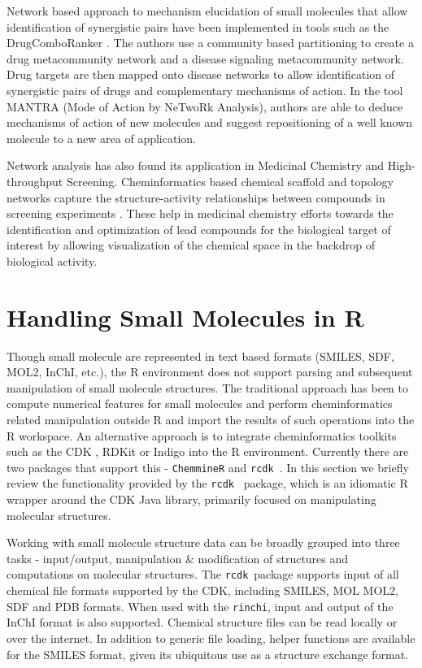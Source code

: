 \documentclass[12pt,letterpaper]{article}
\newcommand{\rcdk}{\texttt{rcdk}\ }
\begin{document}
Network based approach to mechanism elucidation of small molecules that allow identification of synergistic pairs have been implemented in tools such as the DrugComboRanker \cite{huang2014drugcomboranker}. The authors use a community based partitioning to create a drug metacommunity network and a disease signaling metacommunity network. Drug targets are then mapped onto disease networks to allow identification of synergistic pairs of drugs and complementary mechanisms of action.
In the tool MANTRA (Mode of Action by NeTwoRk Analysis)\cite{iorio2010discovery}, authors are able to deduce mechanisms of action of new molecules and suggest repositioning of a well known molecule to a new area of application.

Network analysis has also found its application in Medicinal Chemistry and High-throughput Screening. Cheminformatics based chemical scaffold and topology networks capture the structure-activity relationships between compounds in screening experiments \cite{varin2011mining}. These help in medicinal chemistry efforts towards the identification and optimization of lead compounds for the  biological target of interest by allowing visualization of the chemical space in the backdrop of biological activity. 
  

\section{Handling Small Molecules in R}
\label{sec:handl-small-molec}

Though small molecule are represented in text based formats (SMILES,
SDF, MOL2, InChI, etc.), the R environment does not support parsing
and subsequent manipulation of small molecule structures. The
traditional approach has been to compute numerical features for small
molecules and perform cheminformatics related manipulation outside R
and import the results of such operations into the R workspace. An
alternative approach is to integrate cheminformatics toolkits such as
the CDK \cite{Steinbeck:2003bh}, RDKit or Indigo into the R
environment. Currently there are two packages that support this -
\texttt{ChemmineR} \cite{Cao:2008fj} and \rcdk \cite{Guha:2007aa}. In this
section we briefly review the functionality provided by the \rcdk
package, which is an idiomatic R wrapper around the CDK Java library,
primarily focused on manipulating molecular structures.

Working with small molecule structure data can be broadly grouped into
three tasks - input/output, manipulation \& modification of structures
and computations on molecular structures. The \rcdk package supports
input of all chemical file formats supported by the CDK, including
SMILES, MOL MOL2, SDF and PDB formats. When used with the
\texttt{rinchi}, input and output of the InChI format is also
supported. Chemical structure files can be read locally or over the
internet. In addition to generic file loading, helper functions are
available for the SMILES format, given its ubiquitous use as a
structure exchange format.
\end{document}
